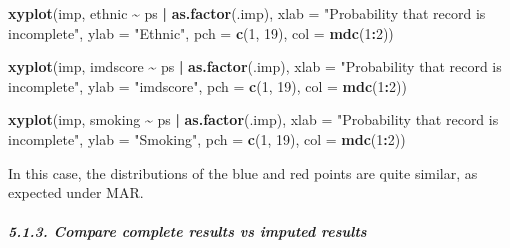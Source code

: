 \documentclass[
]{article}
\newenvironment{Shaded}{\begin{snugshade}}{\end{snugshade}}
\newcommand{\AttributeTok}[1]{\textcolor[rgb]{0.13,0.29,0.53}{#1}}
\newcommand{\DecValTok}[1]{\textcolor[rgb]{0.00,0.00,0.81}{#1}}
\newcommand{\FunctionTok}[1]{\textcolor[rgb]{0.13,0.29,0.53}{\textbf{#1}}}
\newcommand{\NormalTok}[1]{#1}
\newcommand{\SpecialCharTok}[1]{\textcolor[rgb]{0.81,0.36,0.00}{\textbf{#1}}}
\newcommand{\StringTok}[1]{\textcolor[rgb]{0.31,0.60,0.02}{#1}}
\begin{document}
\begin{Shaded}
\begin{Highlighting}[]
\FunctionTok{xyplot}\NormalTok{(imp, ethnic }\SpecialCharTok{\textasciitilde{}}\NormalTok{ ps }\SpecialCharTok{|} \FunctionTok{as.factor}\NormalTok{(.imp),}
       \AttributeTok{xlab =} \StringTok{"Probability that record is incomplete"}\NormalTok{,}
       \AttributeTok{ylab =} \StringTok{"Ethnic"}\NormalTok{, }\AttributeTok{pch =} \FunctionTok{c}\NormalTok{(}\DecValTok{1}\NormalTok{, }\DecValTok{19}\NormalTok{), }\AttributeTok{col =} \FunctionTok{mdc}\NormalTok{(}\DecValTok{1}\SpecialCharTok{:}\DecValTok{2}\NormalTok{))}
\end{Highlighting}
\end{Shaded}

\begin{Shaded}
\begin{Highlighting}[]
\FunctionTok{xyplot}\NormalTok{(imp, imdscore }\SpecialCharTok{\textasciitilde{}}\NormalTok{ ps }\SpecialCharTok{|} \FunctionTok{as.factor}\NormalTok{(.imp),}
       \AttributeTok{xlab =} \StringTok{"Probability that record is incomplete"}\NormalTok{,}
       \AttributeTok{ylab =} \StringTok{"imdscore"}\NormalTok{, }\AttributeTok{pch =} \FunctionTok{c}\NormalTok{(}\DecValTok{1}\NormalTok{, }\DecValTok{19}\NormalTok{), }\AttributeTok{col =} \FunctionTok{mdc}\NormalTok{(}\DecValTok{1}\SpecialCharTok{:}\DecValTok{2}\NormalTok{))}
\end{Highlighting}
\end{Shaded}

\begin{Shaded}
\begin{Highlighting}[]
\FunctionTok{xyplot}\NormalTok{(imp, smoking }\SpecialCharTok{\textasciitilde{}}\NormalTok{ ps }\SpecialCharTok{|} \FunctionTok{as.factor}\NormalTok{(.imp),}
       \AttributeTok{xlab =} \StringTok{"Probability that record is incomplete"}\NormalTok{,}
       \AttributeTok{ylab =} \StringTok{"Smoking"}\NormalTok{, }\AttributeTok{pch =} \FunctionTok{c}\NormalTok{(}\DecValTok{1}\NormalTok{, }\DecValTok{19}\NormalTok{), }\AttributeTok{col =} \FunctionTok{mdc}\NormalTok{(}\DecValTok{1}\SpecialCharTok{:}\DecValTok{2}\NormalTok{))}
\end{Highlighting}
\end{Shaded}

In this case, the distributions of the blue and red points are quite
similar, as expected under MAR.

\hypertarget{compare-complete-results-vs-imputed-results}{%
\subparagraph{5.1.3. Compare complete results vs imputed
results}\label{compare-complete-results-vs-imputed-results}}
\end{document}
